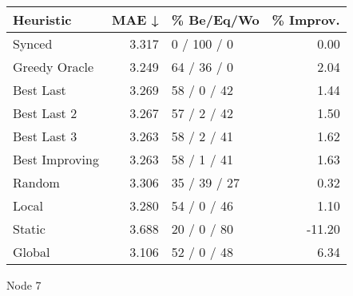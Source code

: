 \begin{tabular}{lrlr}
\toprule
\textbf{Heuristic} & \textbf{MAE ↓} & \textbf{\% Be/Eq/Wo} & \textbf{\% Improv.} \\
\midrule
            Synced &          3.317 &          0 / 100 / 0 &                0.00 \\
     Greedy Oracle &          3.249 &          64 / 36 / 0 &                2.04 \\
         Best Last &          3.269 &          58 / 0 / 42 &                1.44 \\
       Best Last 2 &          3.267 &          57 / 2 / 42 &                1.50 \\
       Best Last 3 &          3.263 &          58 / 2 / 41 &                1.62 \\
    Best Improving &          3.263 &          58 / 1 / 41 &                1.63 \\
            Random &          3.306 &         35 / 39 / 27 &                0.32 \\
             Local &          3.280 &          54 / 0 / 46 &                1.10 \\
            Static &          3.688 &          20 / 0 / 80 &              -11.20 \\
            Global &          3.106 &          52 / 0 / 48 &                6.34 \\
\bottomrule
\end{tabular}
\caption{Node 7}
\label{tab:ds_iid_lr01_le1_bs2_7}
